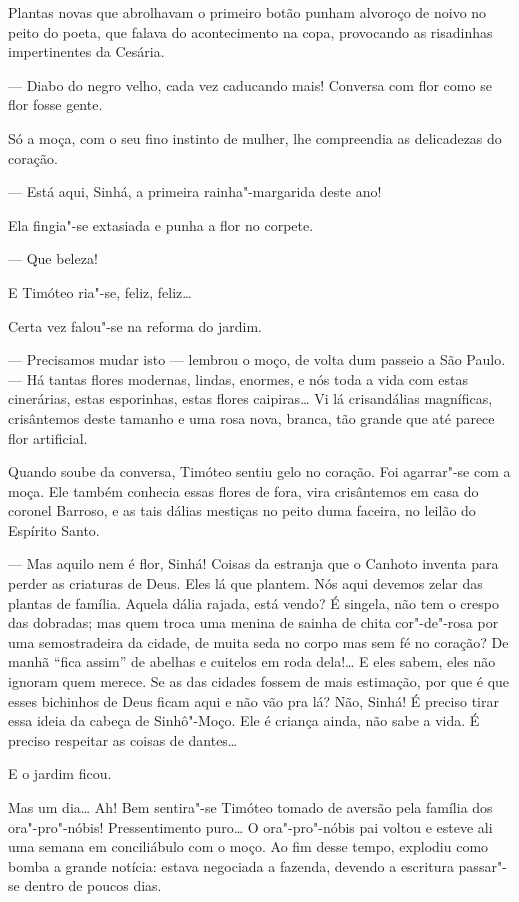 Plantas novas que abrolhavam o primeiro botão punham alvoroço de noivo
no peito do poeta, que falava do acontecimento na copa, provocando as
risadinhas impertinentes da Cesária.

--- Diabo do negro velho, cada vez caducando mais! Conversa com flor
como se flor fosse gente.

Só a moça, com o seu fino instinto de mulher, lhe compreendia as
delicadezas do coração.

--- Está aqui, Sinhá, a primeira rainha"-margarida deste ano!

Ela fingia"-se extasiada e punha a flor no corpete.

--- Que beleza!

E Timóteo ria"-se, feliz, feliz\ldots{}

Certa vez falou"-se na reforma do jardim.

--- Precisamos mudar isto --- lembrou o moço, de volta dum passeio a São
Paulo. --- Há tantas flores modernas, lindas, enormes, e nós toda a vida
com estas cinerárias, estas esporinhas, estas flores caipiras\ldots{} Vi lá
crisandálias magníficas, crisântemos deste tamanho e uma rosa nova,
branca, tão grande que até parece flor artificial.

Quando soube da conversa, Timóteo sentiu gelo no coração. Foi agarrar"-se
com a moça. Ele também conhecia essas flores de fora, vira crisântemos
em casa do coronel Barroso, e as tais dálias mestiças no peito duma
faceira, no leilão do Espírito Santo.

--- Mas aquilo nem é flor, Sinhá! Coisas da estranja que o Canhoto
inventa para perder as criaturas de Deus. Eles lá que plantem. Nós aqui
devemos zelar das plantas de família. Aquela dália rajada, está vendo? É
singela, não tem o crespo das dobradas; mas quem troca uma menina de
sainha de chita cor"-de"-rosa por uma semostradeira da cidade, de muita
seda no corpo mas sem fé no coração? De manhã ``fica assim'' de abelhas
e cuitelos em roda dela!\ldots{} E eles sabem, eles não ignoram quem merece.
Se as das cidades fossem de mais estimação, por que é que esses
bichinhos de Deus ficam aqui e não vão pra lá? Não, Sinhá! É preciso
tirar essa ideia da cabeça de Sinhô"-Moço. Ele é criança ainda, não sabe
a vida. É preciso respeitar as coisas de dantes\ldots{}

E o jardim ficou.

Mas um dia\ldots{} Ah! Bem sentira"-se Timóteo tomado de aversão pela família
dos ora"-pro"-nóbis! Pressentimento puro\ldots{} O ora"-pro"-nóbis pai voltou e
esteve ali uma semana em conciliábulo com o moço. Ao fim desse tempo,
explodiu como bomba a grande notícia: estava negociada a fazenda,
devendo a escritura passar"-se dentro de poucos dias.

